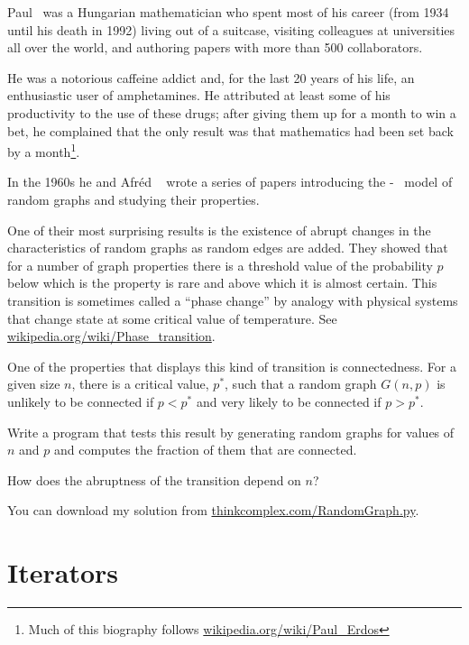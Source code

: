\documentclass[10pt]{book}
\begin{document}
Paul \Erdos~was a Hungarian mathematician who spent most
of his career (from 1934 until his death in 1992) living out
of a suitcase, visiting colleagues at universities all over the
world, and authoring papers with more than 500 collaborators.

He was a notorious caffeine addict and, for the last 20 years of his
life, an enthusiastic user of amphetamines.  He attributed at least
some of his productivity to the use of these drugs; after giving them
up for a month to win a bet, he complained that the only result
was that mathematics had
been set back by a month\footnote{Much of this biography follows
\url{wikipedia.org/wiki/Paul_Erdos}}.

In the 1960s he and Afr\'{e}d \Renyi~ wrote a series of papers
introducing the \Erdos-\Renyi~
model of random graphs and studying their properties.

One of their most surprising results is the existence of
abrupt changes in the characteristics of random graphs as
random edges are added.  They showed that for a number of
graph properties there is a threshold value of the probability
$p$ below which is the property is rare and above which it
is almost certain.  This transition is sometimes called
a ``phase change'' by analogy with physical systems that
change state at some critical value of temperature.
See \url{wikipedia.org/wiki/Phase_transition}.


\begin{exercise}

One of the properties that displays this kind of transition is
connectedness.  For a given size $n$, there is a critical value,
$p^*$, such that a random graph $G(n, p)$ is unlikely to be connected
if $p < p^*$ and very likely to be connected if $p > p^*$.

Write a program that tests this result by generating random graphs for
values of $n$ and $p$ and computes the fraction of them that
are connected.

How does the abruptness of the transition depend on $n$?

You can download my solution from
\url{thinkcomplex.com/RandomGraph.py}.

\end{exercise}


\section{Iterators}
\end{document}
